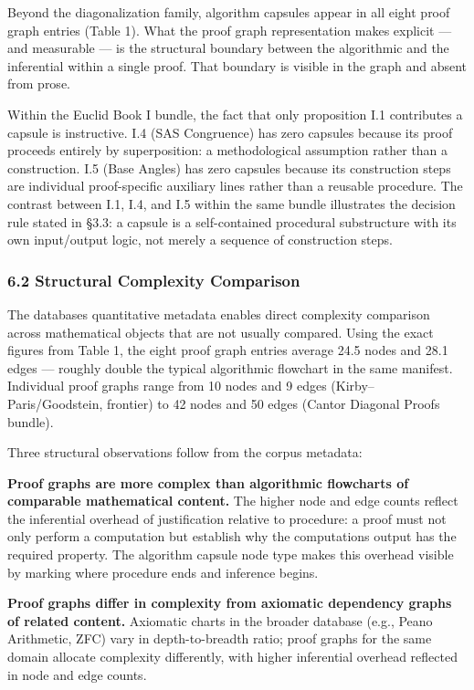 \documentclass[
  11pt]{article}
\begin{document}
Beyond the diagonalization family, algorithm capsules appear in all
eight proof graph entries (Table 1). What the proof graph representation
makes explicit --- and measurable --- is the structural boundary between
the algorithmic and the inferential within a single proof. That boundary
is visible in the graph and absent from prose.

Within the Euclid Book I bundle, the fact that only proposition I.1
contributes a capsule is instructive. I.4 (SAS Congruence) has zero
capsules because its proof proceeds entirely by superposition: a
methodological assumption rather than a construction. I.5 (Base Angles)
has zero capsules because its construction steps are individual
proof-specific auxiliary lines rather than a reusable procedure. The
contrast between I.1, I.4, and I.5 within the same bundle illustrates
the decision rule stated in §3.3: a capsule is a self-contained
procedural substructure with its own input/output logic, not merely a
sequence of construction steps.

\hypertarget{62-structural-complexity-comparison}{%
\subsubsection{6.2 Structural Complexity
Comparison}\label{62-structural-complexity-comparison}}

The database\textquotesingle s quantitative metadata enables direct
complexity comparison across mathematical objects that are not usually
compared. Using the exact figures from Table 1, the eight proof graph
entries average 24.5 nodes and 28.1 edges --- roughly double the typical
algorithmic flowchart in the same manifest. Individual proof graphs
range from 10 nodes and 9 edges (Kirby--Paris/Goodstein, frontier) to 42
nodes and 50 edges (Cantor Diagonal Proofs bundle).

Three structural observations follow from the corpus metadata:

\textbf{Proof graphs are more complex than algorithmic flowcharts of
comparable mathematical content.} The higher node and edge counts
reflect the inferential overhead of justification relative to procedure:
a proof must not only perform a computation but establish why the
computation\textquotesingle s output has the required property. The
algorithm capsule node type makes this overhead visible by marking where
procedure ends and inference begins.

\textbf{Proof graphs differ in complexity from axiomatic dependency
graphs of related content.} Axiomatic charts in the broader database
(e.g., Peano Arithmetic, ZFC) vary in depth-to-breadth ratio; proof
graphs for the same domain allocate complexity differently, with higher
inferential overhead reflected in node and edge counts.
\end{document}
